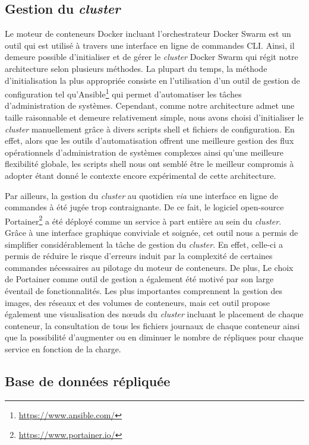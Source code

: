 \subsection{Gestion du \textit{cluster}}

Le moteur de conteneurs Docker incluant l'orchestrateur Docker Swarm est un outil qui est utilisé à travers une interface en ligne de commandes \acs{CLI}. Ainsi, il demeure possible d'initialiser et de gérer le \textit{cluster} Docker Swarm qui régit notre architecture selon plusieurs méthodes. La plupart du temps, la méthode d'initialisation la plus appropriée consiste en l'utilisation d'un outil de gestion de configuration tel qu'Ansible\footnote{\url{https://www.ansible.com/}} qui permet d'automatiser les tâches d'administration de systèmes. Cependant, comme notre architecture admet une taille raisonnable et demeure relativement simple, nous avons choisi d'initialiser le \textit{cluster} manuellement grâce à divers scripts shell et fichiers de configuration. En effet, alors que les outils d'automatisation offrent une meilleure gestion des flux opérationnels d'administration de systèmes complexes ainsi qu'une meilleure flexibilité globale, les scripts shell nous ont semblé être le meilleur compromis à adopter étant donné le contexte encore expérimental de cette architecture.

Par ailleurs, la gestion du \textit{cluster} au quotidien \textit{via} une interface en ligne de commandes à été jugée trop contraignante. De ce fait, le logiciel open-source Portainer\footnote{\url{https://www.portainer.io/}} a été déployé comme un service à part entière au sein du \textit{cluster}. Grâce à une interface graphique conviviale et soignée, cet outil nous a permis de simplifier considérablement la tâche de gestion du \textit{cluster}. En effet, celle-ci a permis de réduire le risque d'erreurs induit par la complexité de certaines commandes nécessaires au pilotage du moteur de conteneurs. De plus, Le choix de Portainer comme outil de gestion a également été motivé par son large éventail de fonctionnalités. Les plus importantes comprennent la gestion des images, des réseaux et des volumes de conteneurs, mais cet outil propose également une visualisation des n\oe{}uds du \textit{cluster} incluant le placement de chaque conteneur, la consultation de tous les fichiers journaux de chaque conteneur ainsi que la possibilité d'augmenter ou en diminuer le nombre de répliques pour chaque service en fonction de la charge.

\subsection{Base de données répliquée}

